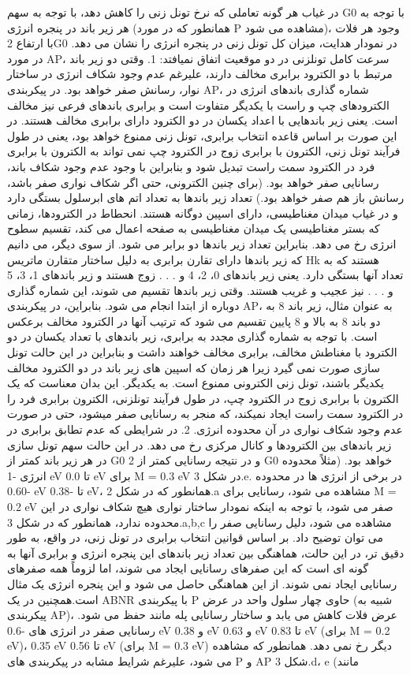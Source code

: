 در غیاب هر گونه تعاملی که نرخ تونل زنی را کاهش دهد، با توجه به سهم  G0 با توجه به هر زیر باند در پنجره انرژی (همانطور که در مورد P مشاهده می شود)، وجود هر فلات با ارتفاع 2G0 در نمودار هدایت، میزان کل تونل زنی در پنجره انرژی را نشان می دهد. در مورد AP، سرعت کامل تونلزنی در دو موقعیت اتفاق نمیافتد: 1. وقتی دو زیر باند مرتبط با دو الکترود برابری مخالف دارند، علیرغم عدم وجود شکاف انرژی در ساختار نوار، رسانش صفر خواهد بود. در پیکربندی AP، شماره گذاری باندهای انرژی در الکترودهای چپ و راست با یکدیگر متفاوت است و برابری باندهای فرعی نیز مخالف است. یعنی زیر باندهایی با اعداد یکسان در دو الکترود دارای برابری مخالف هستند. در این صورت بر اساس قاعده انتخاب برابری، تونل زنی ممنوع خواهد بود، یعنی در طول فرآیند تونل زنی، الکترون با برابری زوج در الکترود چپ نمی تواند به الکترون با برابری فرد در الکترود سمت راست تبدیل شود و بنابراین با وجود عدم وجود شکاف باند، رسانایی صفر خواهد بود. (برای چنین الکترونی، حتی اگر شکاف نواری صفر باشد، رسانش باز هم صفر خواهد بود.) تعداد زیر باندها به تعداد اتم های ابرسلول بستگی دارد و در غیاب میدان مغناطیسی، دارای اسپین دوگانه هستند. انحطاط در الکترودها، زمانی که بستر مغناطیسی یک میدان مغناطیسی به صفحه اعمال می کند، تقسیم سطوح انرژی رخ می دهد. بنابراین تعداد زیر باندها دو برابر می شود. از سوی دیگر، می دانیم که زیر باندها دارای تقارن برابری به دلیل ساختار متقارن ماتریس Hk هستند که به تعداد آنها بستگی دارد. یعنی زیر باندهای 0، 2، 4 و . . . زوج هستند و زیر باندهای 1، 3، 5 و . . . نیز عجیب و غریب هستند. وقتی زیر باندها تقسیم می شوند، این شماره گذاری دوباره از ابتدا انجام می شود. بنابراین، در پیکربندی AP، به عنوان مثال، زیر باند 8 به دو باند 8 به بالا و 8 پایین تقسیم می شود که ترتیب آنها در الکترود مخالف برعکس است. با توجه به شماره گذاری مجدد به برابری، زیر باندهای با تعداد یکسان در دو الکترود با مغناطش مخالف، برابری مخالف خواهند داشت و بنابراین در این حالت تونل سازی صورت نمی گیرد زیرا هر زمان که اسپین های زیر باند در دو الکترود مخالف یکدیگر باشند، تونل زنی الکترونی ممنوع است. به یکدیگر. این بدان معناست که یک الکترون با برابری زوج در الکترود چپ، در طول فرآیند تونلزنی، الکترون برابری فرد را در الکترود سمت راست ایجاد نمیکند، که منجر به رسانایی صفر میشود، حتی در صورت عدم وجود شکاف نواری در آن محدوده انرژی. 2. در شرایطی که عدم تطابق برابری در زیر باندهای بین الکترودها و کانال مرکزی رخ می دهد. در این حالت سهم تونل سازی در هر زیر باند کمتر از G0 و در نتیجه رسانایی کمتر از 2 G0 خواهد بود. (مثلاً محدوده انرژی -1 eV تا 0.0 eV برای M = 0.3 eV در شکل 3.e. در برخی از انرژی ها در محدوده -0.60 eV تا -0.38 eV، همانطور که در شکل 2.a مشاهده می شود، رسانایی برای M = 0.2 eV صفر می شود، با توجه به اینکه نمودار ساختار نواری هیچ شکاف نواری در این محدوده ندارد، همانطور که در شکل 3.a,b,c مشاهده می شود، دلیل رسانایی صفر را می توان توضیح داد. بر اساس قوانین انتخاب برابری در تونل زنی، در واقع، به طور دقیق تر، در این حالت، هماهنگی بین تعداد زیر باندهای این پنجره انرژی و برابری آنها به گونه ای است که این صفرهای رسانایی ایجاد می شوند، اما لزوماً همه صفرهای رسانایی ایجاد نمی شوند. از این هماهنگی حاصل می شود و این پنجره انرژی یک مثال است.همچنین در یک ABNR با پیکربندی P حاوی چهار سلول واحد در عرض (شبیه به پیکربندی AP)، عرض فلات کاهش می یابد و ساختار رسانایی پله مانند حفظ می شود. رسانایی صفر در انرژی های -0.6 eV و 0.38 eV و 0.63 eV تا 0.83 eV (برای M = 0.2 eV)، 0.35 eV تا 0.56 eV (برای M = 0.3 eV) دیگر رخ نمی دهد. همانطور که مشاهده می شود، علیرغم شرایط مشابه در پیکربندی های P و AP شکل 3.d، e (مانند 
